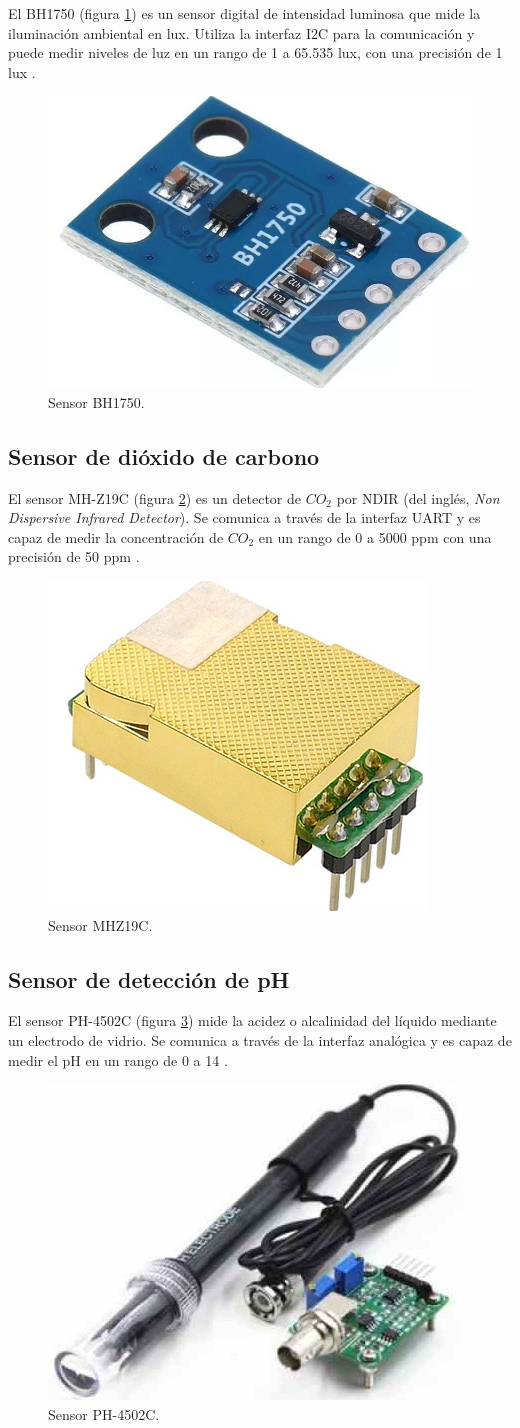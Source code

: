 El BH1750 (figura \ref{fig:BH1750}) es un sensor digital de intensidad luminosa
que mide la iluminación ambiental en lux. Utiliza la interfaz I2C para la
comunicación y puede medir niveles de luz en un rango de 1 a 65.535 lux, con
una precisión de 1 lux \cite{ROHM_BH1750}.

\begin{figure}[H]
	\centering
	\includegraphics[height=.15\textwidth]{./Images/5.png}
	\caption{Sensor BH1750.}
	\label{fig:BH1750}
\end{figure}

\subsection{Sensor de dióxido de carbono}

El sensor MH-Z19C (figura \ref{fig:MHZ19C}) es un detector de $CO_2$ por NDIR
(del inglés, \textit{Non Dispersive Infrared Detector}). Se comunica a través de la
interfaz UART y es capaz de medir la concentración de $CO_2$ en un rango de 0 a
5000 ppm con una precisión de 50 ppm \cite{WINSEN_MHZ19C}.

\begin{figure}[H]
	\centering
	\includegraphics[height=.15\textwidth]{./Images/6.png}
	\caption{Sensor MHZ19C.}
	\label{fig:MHZ19C}
\end{figure}

\subsection{Sensor de detección de pH}

El sensor PH-4502C (figura \ref{fig:PH4502C}) mide la acidez o alcalinidad del
líquido mediante un electrodo de vidrio. Se comunica a través de la interfaz
analógica y es capaz de medir el pH en un rango de 0 a 14 \cite{PH-4502C}.

\begin{figure}[H]
	\centering
	\includegraphics[height=.15\textwidth]{./Images/7.png}
	\caption{Sensor PH-4502C.}
	\label{fig:PH4502C}
\end{figure}

